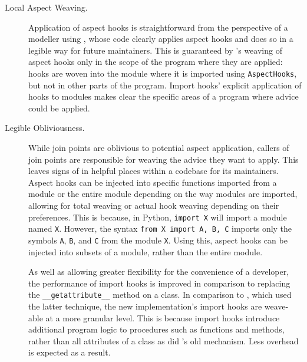\begin{description}
    \item[Local Aspect Weaving.] Application of aspect hooks is straightforward
        from the perspective of a modeller using \pdsfthree{}, whose code clearly
        applies aspect hooks and does so in a legible way for future
        maintainers. This is guaranteed by \pdsfthree{}'s weaving of aspect hooks
        only in the scope of the program where they are applied: hooks are woven
        into the module where it is imported using \lstinline{AspectHooks}, but
        not in other parts of the program. Import hooks' explicit application of
        hooks to modules makes clear the specific areas of a program where
        advice could be applied.

    \item[Legible Obliviousness.] While join points are oblivious to potential
        aspect application, callers of join points are responsible for weaving
        the advice they want to apply. This leaves signs of \aspectorientation{}
        in helpful places within a codebase for its maintainers. Aspect hooks
        can be injected into specific functions imported from a module or the
        entire module depending on the way modules are imported, allowing for
        total weaving or actual hook weaving depending on their preferences.
        This is because, in Python, \lstinline{import X} will import a module
        named \lstinline{X}. However, the syntax \lstinline{from X import A, B, C} imports only
        the symbols \lstinline{A}, \lstinline{B}, and \lstinline{C} from the
        module \lstinline{X}. Using this, aspect hooks can be injected into
        subsets of a module, rather than the entire module.
        
        As well as allowing greater flexibility for the convenience of a
        developer, the performance of import hooks is improved in comparison to
        replacing the \lstinline{__getattribute__} method on a class. In
        comparison to \pydysofu{}, which used the
        latter technique, the new implementation's import hooks are weave-able
        at a more granular level. This is because import hooks introduce
        additional program logic to procedures such as functions and methods,
        rather than all attributes of a class as did
        \pydysofu{}'s old mechanism. Less overhead is expected as a result.


\end{description}
